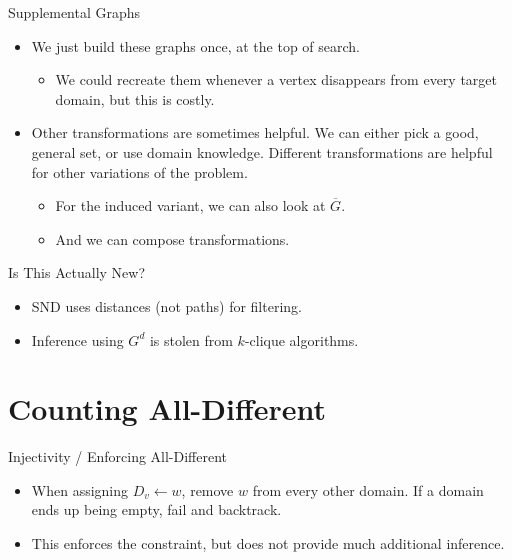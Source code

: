 \documentclass{beamer}
\begin{document}
\begin{frame}{Supplemental Graphs}
    \begin{itemize}
        \item We just build these graphs once, at the top of search.

            \begin{itemize}
                \item We could recreate them whenever a vertex disappears from every target domain,
                    but this is costly.
            \end{itemize}

        \item Other transformations are sometimes helpful. We can either pick a good, general set,
            or use domain knowledge. Different transformations are helpful for other variations of
            the problem.

            \begin{itemize}
                \item For the induced variant, we can also look at $\overline{G}$.
                \item And we can compose transformations.
            \end{itemize}
    \end{itemize}
\end{frame}

\begin{frame}{Is This Actually New?}
    \begin{itemize}
        \item SND uses distances (not paths) for filtering.

        \item Inference using $G^d$ is stolen from $k$-clique algorithms.
    \end{itemize}
\end{frame}

\section{Counting All-Different}

\frame{\sectionpage}

\begin{frame}{Injectivity / Enforcing All-Different}
    \begin{itemize}
        \item When assigning $D_v \gets w$, remove $w$ from every other domain. If a domain ends up
            being empty, fail and backtrack.

        \item This enforces the constraint, but does not provide much additional inference.
    \end{itemize}
\end{frame}
\end{document}

